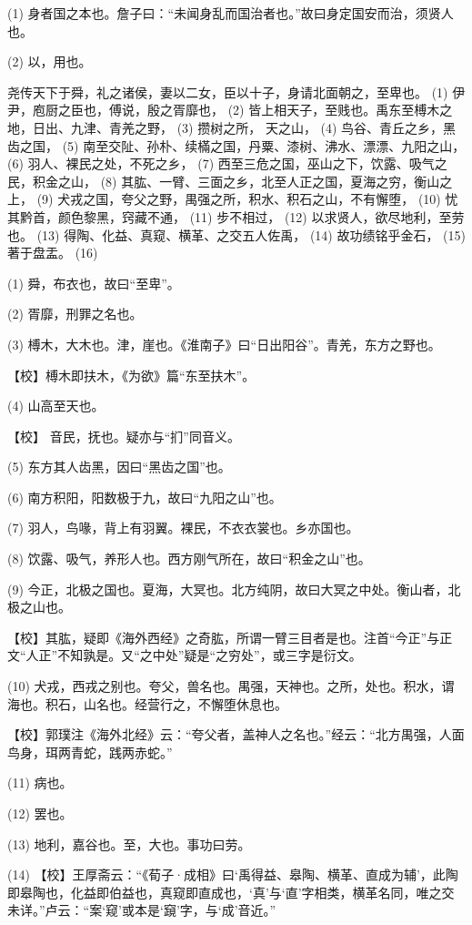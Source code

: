 \documentclass[12pt,UTF8]{ctexbook}
\begin{document}
(1) 身者国之本也。詹子曰：“未闻身乱而国治者也。”故曰身定国安而治，须贤人也。

(2) 以，用也。

尧传天下于舜，礼之诸侯，妻以二女，臣以十子，身请北面朝之，至卑也。 (1) 伊尹，庖厨之臣也，傅说，殷之胥靡也， (2) 皆上相天子，至贱也。禹东至榑木之地，日出、九津、青羌之野， (3) 攒树之所， 天之山， (4) 鸟谷、青丘之乡，黑齿之国， (5) 南至交阯、孙朴、续樠之国，丹粟、漆树、沸水、漂漂、九阳之山， (6) 羽人、裸民之处，不死之乡， (7) 西至三危之国，巫山之下，饮露、吸气之民，积金之山， (8) 其肱、一臂、三面之乡，北至人正之国，夏海之穷，衡山之上， (9) 犬戎之国，夸父之野，禺强之所，积水、积石之山，不有懈堕， (10) 忧其黔首，颜色黎黑，窍藏不通， (11) 步不相过， (12) 以求贤人，欲尽地利，至劳也。 (13) 得陶、化益、真窥、横革、之交五人佐禹， (14) 故功绩铭乎金石， (15) 著于盘盂。 (16)

(1) 舜，布衣也，故曰“至卑”。

(2) 胥靡，刑罪之名也。

(3) 榑木，大木也。津，崖也。《淮南子》曰“日出阳谷”。青羌，东方之野也。

【校】榑木即扶木，《为欲》篇“东至扶木”。

(4) 山高至天也。

【校】 音民，抚也。疑亦与“扪”同音义。

(5) 东方其人齿黑，因曰“黑齿之国”也。

(6) 南方积阳，阳数极于九，故曰“九阳之山”也。

(7) 羽人，鸟喙，背上有羽翼。裸民，不衣衣裳也。乡亦国也。

(8) 饮露、吸气，养形人也。西方刚气所在，故曰“积金之山”也。

(9) 今正，北极之国也。夏海，大冥也。北方纯阴，故曰大冥之中处。衡山者，北极之山也。

【校】其肱，疑即《海外西经》之奇肱，所谓一臂三目者是也。注首“今正”与正文“人正”不知孰是。又“之中处”疑是“之穷处”，或三字是衍文。

(10) 犬戎，西戎之别也。夸父，兽名也。禺强，天神也。之所，处也。积水，谓海也。积石，山名也。经营行之，不懈堕休息也。

【校】郭璞注《海外北经》云：“夸父者，盖神人之名也。”经云：“北方禺强，人面鸟身，珥两青蛇，践两赤蛇。”

(11) 病也。

(12) 罢也。

(13) 地利，嘉谷也。至，大也。事功曰劳。

(14) 【校】王厚斋云：“《荀子·成相》曰‘禹得益、皋陶、横革、直成为辅’，此陶即皋陶也，化益即伯益也，真窥即直成也，‘真’与‘直’字相类，横革名同，唯之交未详。”卢云：“案‘窥’或本是‘竀’字，与‘成’音近。”
\end{document}

